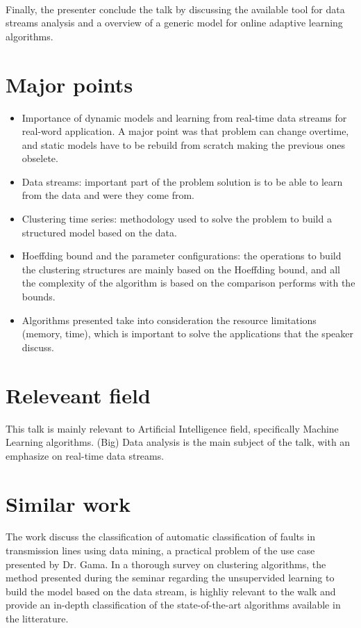 \documentclass[11pt,a4paper]{article}
\begin{document}
\paragraph{}


Finally, the presenter conclude the talk by discussing the available tool for data streams analysis and a overview of a generic model for online adaptive learning algorithms.

\section{Major points}


\begin{itemize}
  \item Importance of dynamic models and learning from real-time data streams for real-word application. A major point was that problem can change overtime, and static models have to be rebuild from scratch making the previous ones obselete.
  \item Data streams: important part of the problem solution is to be able to learn from the data and were they come from.
  \item Clustering time series: methodology used to solve the problem to build a structured model based on the data.
  \item Hoeffding bound and the parameter configurations: the operations to build the clustering structures are mainly based on the Hoeffding bound, and all the complexity of the algorithm is based on the comparison performs with the bounds.
  \item Algorithms presented take into consideration the resource limitations (memory, time), which is important to solve the applications that the speaker discuss.
\end{itemize}

\section{Releveant field}

This talk is mainly relevant to Artificial Intelligence field, specifically Machine Learning algorithms. (Big) Data analysis is the main subject of the talk, with an emphasize on real-time data streams.

\section{Similar work}


The work  discuss the classification of automatic classification of faults in transmission lines using data mining, a practical problem of the use case presented by Dr. Gama. In  a thorough survey on clustering algorithms, the method presented during the seminar regarding the unsupervided learning to build the model based on the data stream, is highliy relevant to the walk and provide an in-depth classification of the state-of-the-art algorithms available in the litterature.
\end{document}

